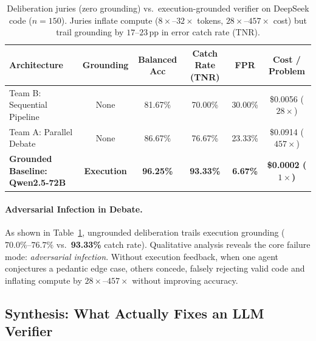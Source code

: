 \begin{table}[t]
\centering
\footnotesize
\renewcommand{\arraystretch}{0.92}
\caption{Deliberation juries (zero grounding) vs.\ execution-grounded verifier on DeepSeek code ($n = 150$). Juries inflate compute ($8\times\text{--}32\times$ tokens, $28\times\text{--}457\times$ cost) but trail grounding by $17\text{--}23$\,pp in error catch rate (TNR).}
\label{tab:jury-comparison}
\begin{tabular}{lccccc}
\toprule
\bf Architecture & \bf Grounding & \bf Balanced Acc & \bf Catch Rate (TNR) & \bf FPR & \bf Cost / Problem \\
\midrule
Team B: Sequential Pipeline  & None & 81.67\% & 70.00\% & 30.00\% & \$0.0056 ($28\times$) \\
Team A: Parallel Debate       & None & 86.67\% & 76.67\% & 23.33\% & \$0.0914 ($457\times$) \\
\midrule
\bf Grounded Baseline: Qwen2.5-72B & \bf Execution & \bf 96.25\% & \bf 93.33\% & \bf 6.67\% & \bf \$\bf 0.0002 ($1\times$) \\
\bottomrule
\end{tabular}
\end{table}

\paragraph{Adversarial Infection in Debate.}
As shown in Table~\ref{tab:jury-comparison}, ungrounded deliberation trails execution grounding ($70.0\%\text{--}76.7\%$ vs.\ \textbf{93.33\%} catch rate). Qualitative analysis reveals the core failure mode: \emph{adversarial infection}. Without execution feedback, when one agent conjectures a pedantic edge case, others concede, falsely rejecting valid code and inflating compute by $28\times\text{--}457\times$ without improving accuracy.

\subsection{Synthesis: What Actually Fixes an LLM Verifier}
\label{sec:results-synthesis}

